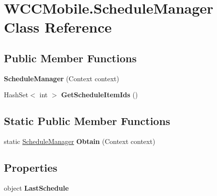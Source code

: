\hypertarget{class_w_c_c_mobile_1_1_schedule_manager}{}\section{W\+C\+C\+Mobile.\+Schedule\+Manager Class Reference}
\label{class_w_c_c_mobile_1_1_schedule_manager}
\subsection*{Public Member Functions}
\begin{DoxyCompactItemize}
\item 
{\bfseries Schedule\+Manager} (Context context)\hypertarget{class_w_c_c_mobile_1_1_schedule_manager_a9dbc4604f85762b82dfc0c2a61adbf63}{}\label{class_w_c_c_mobile_1_1_schedule_manager_a9dbc4604f85762b82dfc0c2a61adbf63}

\item 
Hash\+Set$<$ int $>$ {\bfseries Get\+Schedule\+Item\+Ids} ()\hypertarget{class_w_c_c_mobile_1_1_schedule_manager_a6885a2183fceb0e1081929192781de20}{}\label{class_w_c_c_mobile_1_1_schedule_manager_a6885a2183fceb0e1081929192781de20}

\end{DoxyCompactItemize}
\subsection*{Static Public Member Functions}
\begin{DoxyCompactItemize}
\item 
static \hyperlink{class_w_c_c_mobile_1_1_schedule_manager}{Schedule\+Manager} {\bfseries Obtain} (Context context)\hypertarget{class_w_c_c_mobile_1_1_schedule_manager_addd61b930a1af249a754fab52abe0d38}{}\label{class_w_c_c_mobile_1_1_schedule_manager_addd61b930a1af249a754fab52abe0d38}

\end{DoxyCompactItemize}
\subsection*{Properties}
\begin{DoxyCompactItemize}
\item 
object {\bfseries Last\+Schedule}\hypertarget{class_w_c_c_mobile_1_1_schedule_manager_a409ab82e52432f798e97963b23fbc98c}{}\label{class_w_c_c_mobile_1_1_schedule_manager_a409ab82e52432f798e97963b23fbc98c}

\end{DoxyCompactItemize}
